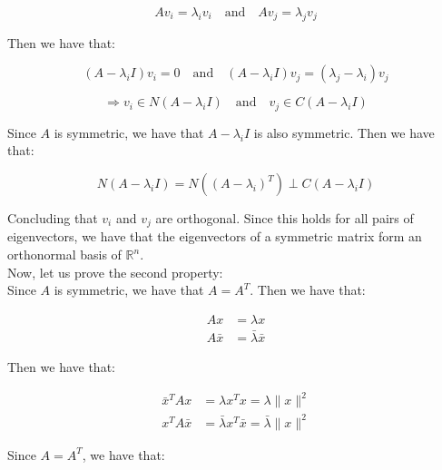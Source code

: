\begin{equation}
    A v_i = \lambda_i v_i \quad \text{and} \quad A v_j = \lambda_j v_j
\end{equation}

Then we have that:

\begin{equation*}
    (A - \lambda_i I) v_i = 0 \quad \text{and} \quad (A - \lambda_i I) v_j = (\lambda_j - \lambda_i) v_j 
\end{equation*}

\begin{equation}
    \Rightarrow v_i \in N(A - \lambda_i I) \quad \text{and} \quad v_j \in C(A - \lambda_i I)
\end{equation}

Since $A$ is symmetric, we have that $A - \lambda_i I$ is also symmetric. Then we have that:

\begin{equation}
    N(A - \lambda_i I) = N((A - \lambda_i)^T) \perp C(A - \lambda_i I)
\end{equation}

Concluding that $v_i$ and $v_j$ are orthogonal. Since this holds for all pairs of eigenvectors, we have that the eigenvectors
of a symmetric matrix form an orthonormal basis of $\mathbb{R}^n$.\\

Now, let us prove the second property:\\

Since $A$ is symmetric, we have that $A = A^T$. Then we have that:

\begin{equation}
    \begin{aligned}
        A x &= \lambda x \\
        A \bar{x} &= \bar{\lambda} \bar{x}
    \end{aligned}
\end{equation}

Then we have that:

\begin{equation}
    \begin{aligned}
        \bar{x}^T A x &= \lambda x^T x = \lambda \|x\|^2 \\
        x^T A \bar{x} &= \bar{\lambda} x^T \bar{x} = \bar{\lambda} \|x\|^2
    \end{aligned}
\end{equation}

Since $A = A^T$, we have that:

